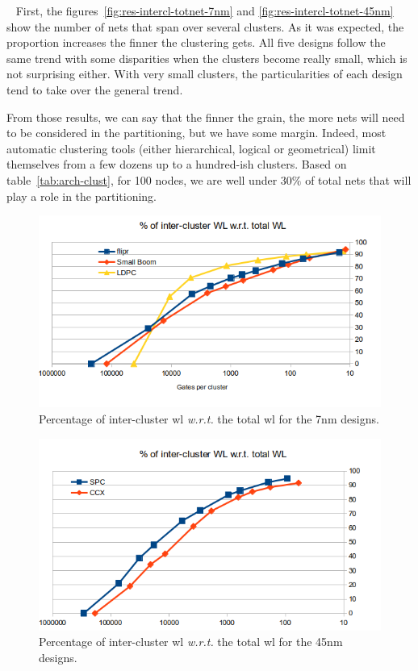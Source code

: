 \documentclass[11pt,a4paper]{report} %
\theoremstyle{customdef}
\begin{document}
~\newline{}
First, the figures~\ref{fig:res-intercl-totnet-7nm} and \ref{fig:res-intercl-totnet-45nm} show the number of nets that span over several clusters.
As it was expected, the proportion increases the finner the clustering gets.
All five designs follow the same trend with some disparities when the clusters become really small, which is not surprising either.
With very small clusters, the particularities of each design tend to take over the general trend.

From those results, we can say that the finner the grain, the more nets will need to be considered in the partitioning, but we have some margin.
Indeed, most automatic clustering tools (either hierarchical, logical or geometrical) limit themselves from a few dozens up to a hundred-ish clusters.
Based on table~\ref{tab:arch-clust}, for 100 nodes, we are well under $30\%$ of total nets that will play a role in the partitioning.



\begin{figure}[!h]
	\centering
	\includegraphics[width=.9\textwidth]{img/res-inter-cluster-totalWL-7nm.png}
	\caption{Percentage of inter-cluster \gls{wl} \textit{w.r.t.} the total \gls{wl} for the 7nm designs.}
	\label{fig:res-intercl-totwl-7nm}
\end{figure}
\begin{figure}[!h]
	\centering
	\includegraphics[width=.9\textwidth]{img/res-inter-cluster-totalWL-45nm.png}
	\caption{Percentage of inter-cluster \gls{wl} \textit{w.r.t.} the total \gls{wl} for the 45nm designs.}
	\label{fig:res-intercl-totWL-45nm}
\end{figure}
\end{document}
